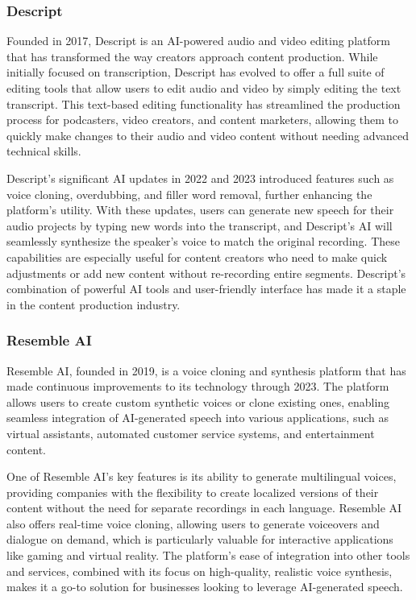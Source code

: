 \subsubsection{Descript}

Founded in 2017, Descript is an AI-powered audio and video editing platform that has transformed the way creators approach content production. 
While initially focused on transcription, Descript has evolved to offer a full suite of editing tools that allow users to edit audio and video by simply editing the text transcript. 
This text-based editing functionality has streamlined the production process for podcasters, video creators, and content marketers, allowing them to quickly make changes to their audio and video content without needing advanced technical skills.

Descript’s significant AI updates in 2022 and 2023 introduced features such as voice cloning, overdubbing, and filler word removal, further enhancing the platform’s utility. 
With these updates, users can generate new speech for their audio projects by typing new words into the transcript, and Descript’s AI will seamlessly synthesize the speaker’s voice to match the original recording. 
These capabilities are especially useful for content creators who need to make quick adjustments or add new content without re-recording entire segments. 
Descript’s combination of powerful AI tools and user-friendly interface has made it a staple in the content production industry.

\subsubsection{Resemble AI}

Resemble AI, founded in 2019, is a voice cloning and synthesis platform that has made continuous improvements to its technology through 2023. 
The platform allows users to create custom synthetic voices or clone existing ones, enabling seamless integration of AI-generated speech into various applications, such as virtual assistants, automated customer service systems, and entertainment content.

One of Resemble AI’s key features is its ability to generate multilingual voices, providing companies with the flexibility to create localized versions of their content without the need for separate recordings in each language. 
Resemble AI also offers real-time voice cloning, allowing users to generate voiceovers and dialogue on demand, which is particularly valuable for interactive applications like gaming and virtual reality. 
The platform’s ease of integration into other tools and services, combined with its focus on high-quality, realistic voice synthesis, makes it a go-to solution for businesses looking to leverage AI-generated speech.

